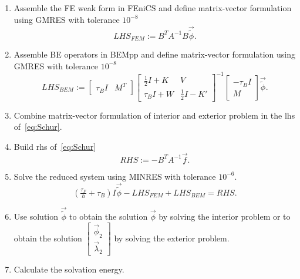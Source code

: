 \begin{enumerate}
 \item Assemble the FE weak form in FEniCS and define matrix-vector formulation  using GMRES with tolerance $10^{-8}$
 \begin{equation*}
 LHS_{FEM} := B^T A^{-1} B \vec{\widetilde{\phi}} .
 \end{equation*}
 \item Assemble BE operators in BEMpp and define matrix-vector formulation 
using GMRES with tolerance $10^{-8}$
 \begin{equation*}
 LHS_{BEM} := \begin{bmatrix} \tau_B I & M^T \end{bmatrix} \begin{bmatrix}
\tfrac12 I + K &  V  \\
\tau_B I + W & \tfrac12 I - K'
\end{bmatrix}^{-1}
\begin{bmatrix}
 -\tau_B I \\
M
\end{bmatrix} 
\vec{\widetilde{\phi}}  .
 \end{equation*}
 \item Combine matrix-vector formulation of interior and exterior problem in the lhs of~\eqref{eq:Schur}.
 \item Build rhs of~\eqref{eq:Schur}
 \begin{equation*}
 RHS := -B^T A^{-1} \vec{f}.
 \end{equation*}
 \item Solve the reduced system using MINRES with tolerance $10^{-6}$.
 \begin{equation*}
 \left(\tfrac{\tau_F}{h} + \tau_B\right) I \vec{\widetilde{\phi}}  - LHS_{FEM} + LHS_{BEM} = RHS .
 \end{equation*}
 \item Use solution $\vec{\widetilde{\phi}}$ to obtain the solution $\vec{\phi}$ by solving the interior problem or to obtain the solution $\begin{bmatrix} \vec{\phi}_2 \\ \vec{\lambda}_2 \end{bmatrix}$ by solving the exterior problem.
 \item Calculate the solvation energy.
\end{enumerate}
